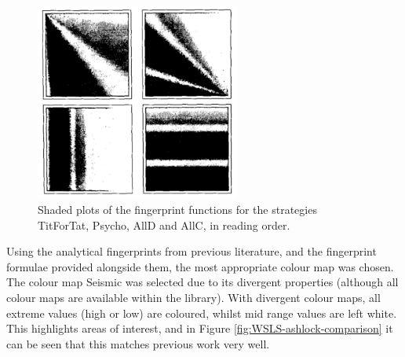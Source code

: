\begin{figure}[hbtp!]
    \begin{center}
        \includegraphics[width = 0.6\textwidth]{../img/MultipleFingerprintsAshlock}
    \end{center}
    \caption{Shaded plots of the fingerprint functions for the strategies TitForTat, Psycho, AllD and AllC, in reading order.}
    \label{fig:ashlock-fingerprints}
\end{figure}

Using the analytical fingerprints from previous literature, and the fingerprint formulae provided alongside them, the most appropriate colour map was chosen.
The colour map Seismic was selected due to its divergent properties (although all colour maps are available within the library).
With divergent colour maps, all extreme values (high or low) are coloured, whilst mid range values are left white.
This highlights areas of interest, and in Figure \ref{fig:WSLS-ashlock-comparison} it can be seen that this matches previous work very well.

